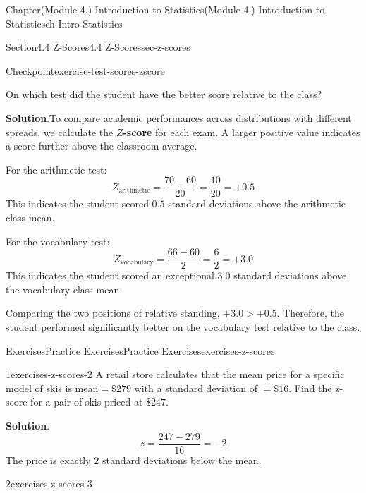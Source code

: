 \documentclass[oneside,10pt,]{book}
\newcommand{\blocktitlefont}{\relax}
\newcommand{\ptxlistdisc}{\raisebox{0.3ex}{\textbullet}}
\newcommand{\terminology}[1]{\textbf{#1}}
\newcommand{\gt}{>}
\begin{document}
\begin{chapterptx}{Chapter}{(Module 4.) Introduction to Statistics}{}{(Module 4.) Introduction to Statistics}{}{}{ch-Intro-Statistics}
\begin{sectionptx}{Section}{4.4 Z-Scores}{}{4.4 Z-Scores}{}{}{sec-z-scores}
\begin{inlineexercise}{Checkpoint}{}{exercise-test-scores-zscore}
\begin{itemize}[label=\ptxlistdisc]
\end{itemize}
On which test did the student have the better score relative to the class?%
\par\smallskip%
\noindent\textbf{\blocktitlefont Solution}.\hypertarget{exercise-test-scores-zscore-2}{}\quad{}To compare academic performances across distributions with different spreads, we calculate the \terminology{\(Z\)-score} for each exam. A larger positive value indicates a score further above the classroom average.%
\par
For the arithmetic test:%
\begin{equation*}
Z_{\text{arithmetic}} = \frac{70 - 60}{20} = \frac{10}{20} = +0.5
\end{equation*}
This indicates the student scored \(0.5\) standard deviations above the arithmetic class mean.%
\par
For the vocabulary test:%
\begin{equation*}
Z_{\text{vocabulary}} = \frac{66 - 60}{2} = \frac{6}{2} = +3.0
\end{equation*}
This indicates the student scored an exceptional \(3.0\) standard deviations above the vocabulary class mean.%
\par
Comparing the two positions of relative standing, \(+3.0 \gt +0.5\). Therefore, the student performed significantly better on the vocabulary test relative to the class.%
\end{inlineexercise}%
%
%
\typeout{************************************************}
\typeout{************************************************}
%
\begin{exercises-subsection-numberless}{Exercises}{Practice Exercises}{}{Practice Exercises}{}{}{exercises-z-scores}
\begin{divisionexercise}{1}{}{}{exercises-z-scores-2}%
A retail store calculates that the mean price for a specific model of skis is mean\(= \$279\) with a standard deviation of \(= \$16\). Find the z-score for a pair of skis priced at \(\$247\).%
\par\smallskip%
\noindent\textbf{\blocktitlefont Solution}.\hypertarget{exercises-z-scores-2-2}{}\quad{}%
\begin{equation*}
z = \frac{247 - 279}{16} = -2
\end{equation*}
The price is exactly \(2\) standard deviations below the mean.%
\end{divisionexercise}%
\begin{divisionexercise}{2}{}{}{exercises-z-scores-3}%

\end{divisionexercise}
\end{exercises-subsection-numberless}
\end{sectionptx}
\end{chapterptx}
\end{document}

